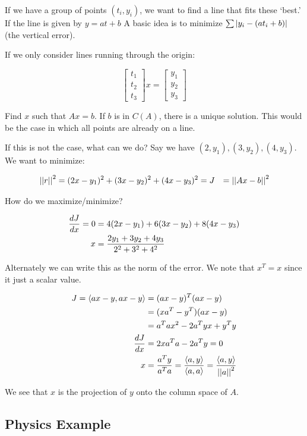 If we have a group of points $(t_i,y_i)$, we want to find a line that fits these `best.' If the line is given by $y = a t + b$ A basic idea is to minimize $\sum \left|y_i - (a t_i + b)\right|$ (the vertical error).

If we only consider lines running through the origin:

\[
  \begin{bmatrix}
    t_1 \\ t_2 \\ t_3
  \end{bmatrix} x =
  \begin{bmatrix}
    y_1 \\ y_2 \\ y_3
  \end{bmatrix}
\]

Find $x$ such that $Ax=b$. If $b$ is in $C(A)$, there is a unique solution. This would be the case in which all points are already on a line.

If this is not the case, what can we do? Say we have $(2,y_1),(3,y_2),(4,y_3).$ We want to minimize:

\begin{align*}
  \left|\left|r\right|\right|^2 &= (2x-y_1)^2 + (3x-y_2)^2 + (4x - y_3)^2 = J
  &= \left|\left|Ax - b\right|\right|^2
\end{align*}

How do we maximize/minimize?


\begin{align*}
  {dJ \over dx} = 0 &= 4 (2x - y_1) + 6 (3x - y_2) + 8 (4x - y_3) \\
  x &= {2y_1 + 3y_2 + 4y_3 \over 2^2 + 3^2 + 4^2 }
\end{align*}

Alternately we can write this as the norm of the error. We note that $x^T = x$ since it just a scalar value.

\begin{align*}
  J = \langle ax - y, ax - y \rangle &= (ax-y)^T (ax-y) \\
  &= (x a^T - y^T)(ax-y) \\
  &= a^Tax^2 - 2a^Tyx + y^Ty\\
  {dJ \over dx} &= 2xa^Ta- 2a^Ty = 0 \\
  x &= {a^T y \over a^T a} = {\langle a,y\rangle \over \langle a,a\rangle} = {\langle a,y\rangle \over \left|\left|a\right|\right|^2}
\end{align*}

We see that $x$ is the projection of $y$ onto the column space of $A$.

\subsection{Physics Example}

